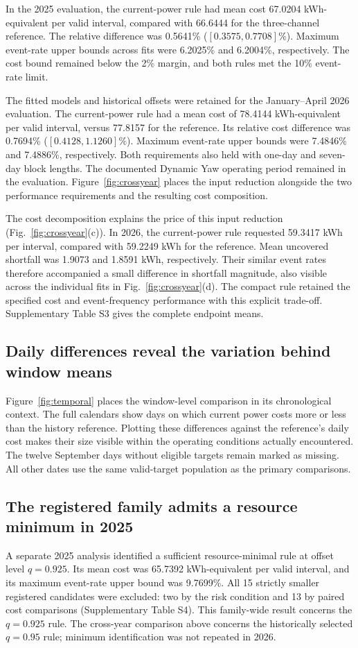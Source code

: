 In the 2025 evaluation, the current-power rule had mean cost 67.0204 kWh-equivalent per valid interval, compared with 66.6444 for the three-channel reference. The relative difference was 0.5641\% ($[0.3575,0.7708]\%$). Maximum event-rate upper bounds across fits were 6.2025\% and 6.2004\%, respectively. The cost bound remained below the 2\% margin, and both rules met the 10\% event-rate limit.

The fitted models and historical offsets were retained for the January--April 2026 evaluation. The current-power rule had a mean cost of 78.4144 kWh-equivalent per valid interval, versus 77.8157 for the reference. Its relative cost difference was 0.7694\% ($[0.4128,1.1260]\%$). Maximum event-rate upper bounds were 7.4846\% and 7.4886\%, respectively. Both requirements also held with one-day and seven-day block lengths. The documented Dynamic Yaw operating period remained in the evaluation. Figure~\ref{fig:crossyear} places the input reduction alongside the two performance requirements and the resulting cost composition.

The cost decomposition explains the price of this input reduction (Fig.~\ref{fig:crossyear}(c)). In 2026, the current-power rule requested 59.3417 kWh per interval, compared with 59.2249 kWh for the reference. Mean uncovered shortfall was 1.9073 and 1.8591 kWh, respectively. Their similar event rates therefore accompanied a small difference in shortfall magnitude, also visible across the individual fits in Fig.~\ref{fig:crossyear}(d). The compact rule retained the specified cost and event-frequency performance with this explicit trade-off. Supplementary Table S3 gives the complete endpoint means.

\subsection{Daily differences reveal the variation behind window means}
Figure~\ref{fig:temporal} places the window-level comparison in its chronological context. The full calendars show days on which current power costs more or less than the history reference. Plotting these differences against the reference's daily cost makes their size visible within the operating conditions actually encountered. The twelve September days without eligible targets remain marked as missing. All other dates use the same valid-target population as the primary comparisons.

\subsection{The registered family admits a resource minimum in 2025}
A separate 2025 analysis identified a sufficient resource-minimal rule at offset level $q=0.925$. Its mean cost was 65.7392 kWh-equivalent per valid interval, and its maximum event-rate upper bound was 9.7699\%. All 15 strictly smaller registered candidates were excluded: two by the risk condition and 13 by paired cost comparisons (Supplementary Table S4). This family-wide result concerns the $q=0.925$ rule. The cross-year comparison above concerns the historically selected $q=0.95$ rule; minimum identification was not repeated in 2026.

